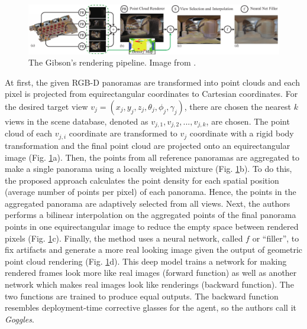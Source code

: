 \begin{figure}[h!]
	\centering
	\includegraphics[width=\linewidth]{images/gibson_rendering_pipeline.pdf}
	\caption{The Gibson's rendering pipeline. Image from \cite{gibson}.}
	\label{fig:gibsonrenderingpipeline}
\end{figure}
At first, the given RGB-D panoramas are transformed into point clouds and each pixel is projected from equirectangular coordinates to Cartesian coordinates. For the desired target view $v_j =
(x_j , y_j , z_j , \theta_j, \phi_j, \gamma_j )$, there are chosen the nearest $k$ views in the
scene database, denoted as $v_{j,1}, v_{j,2}, ..., v_{j,k}$, are chosen. The point cloud of each $v_{j,i}$ coordinate are transformed to $v_j$ coordinate with a rigid body transformation and the final point cloud are projected onto an equirectangular image (Fig. \ref{fig:gibsonrenderingpipeline}a). Then, the points from all reference panoramas are aggregated to make a single panorama using a locally weighted mixture (Fig. \ref{fig:gibsonrenderingpipeline}b). To do this, the proposed approach calculates the point density for each spatial position (average number of points per pixel) of each panorama. Hence, the points in the aggregated panorama are adaptively selected from all views. Next, the authors performs a bilinear interpolation on the aggregated points of the final panorama
points in one equirectangular image to reduce the empty space between rendered pixels (Fig. \ref{fig:gibsonrenderingpipeline}c). Finally, the method uses a neural network, called $f$ or ``filler'', to fix artifacts and generate a more real looking image given the output of geometric point cloud rendering (Fig. \ref{fig:gibsonrenderingpipeline}d). This deep model trains a network for making rendered frames look more like real images (forward function) as well as another network which makes real images look like renderings (backward function). The two functions are trained to produce equal outputs. The backward function resembles deployment-time corrective
glasses for the agent, so the authors call it \textit{Goggles}.




